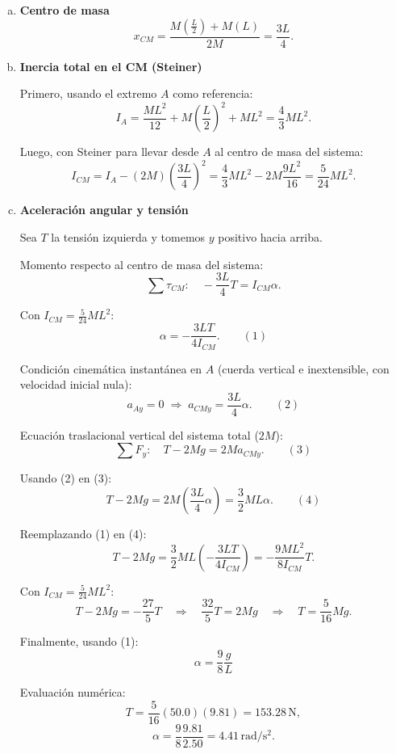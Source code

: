 \begin{enumerate}[a)]
\item \textbf{Centro de masa}
\[
x_{CM}=\frac{M\left(\frac{L}{2}\right)+M(L)}{2M}=\frac{3L}{4}.
\]

\item \textbf{Inercia total en el CM (Steiner)}

Primero, usando el extremo $A$ como referencia:
\[
I_{A}=\frac{ML^2}{12}+M\left(\frac{L}{2}\right)^2+ML^2
=\frac{4}{3}ML^2.
\]

Luego, con Steiner para llevar desde $A$ al centro de masa del sistema:
\[
I_{CM}=I_A-(2M)\left(\frac{3L}{4}\right)^2
=\frac{4}{3}ML^2-2M\frac{9L^2}{16}
=\frac{5}{24}ML^2.
\]

\item \textbf{Aceleración angular y tensión}

Sea $T$ la tensión izquierda y tomemos $y$ positivo hacia arriba.

Momento respecto al centro de masa del sistema:
\[
\sum \tau_{CM}:\quad -\frac{3L}{4}T=I_{CM}\alpha.
\]

Con $I_{CM}=\frac{5}{24}ML^2$:
\[
\alpha=-\frac{3LT}{4I_{CM}}. \qquad (1)
\]

Condición cinemática instantánea en $A$ (cuerda vertical e inextensible, con velocidad inicial nula):
\[
a_{Ay}=0 \;\Rightarrow\; a_{CMy}=\frac{3L}{4}\alpha. \qquad (2)
\]

Ecuación traslacional vertical del sistema total ($2M$):
\[
\sum F_y:\quad T-2Mg=2M a_{CMy}. \qquad (3)
\]

Usando (2) en (3):
\[
T-2Mg=2M\left(\frac{3L}{4}\alpha\right)=\frac{3}{2}ML\alpha. \qquad (4)
\]

Reemplazando (1) en (4):
\[
T-2Mg=\frac{3}{2}ML\left(-\frac{3LT}{4I_{CM}}\right)
=-\frac{9ML^2}{8I_{CM}}T.
\]

Con $I_{CM}=\frac{5}{24}ML^2$:
\[
T-2Mg=-\frac{27}{5}T
\quad\Rightarrow\quad
\frac{32}{5}T=2Mg
\quad\Rightarrow\quad
\boxed{T=\frac{5}{16}Mg}.
\]

Finalmente, usando (1):
\[
\alpha=\frac{9}{8}\frac{g}{L}
\]

Evaluación numérica:
\[
T=\frac{5}{16}(50.0)(9.81)=153.28\,\mathrm{N},
\]
\[
\alpha=\frac{9}{8}\frac{9.81}{2.50}=4.41\,\mathrm{rad/s^2}.
\]
\end{enumerate}
